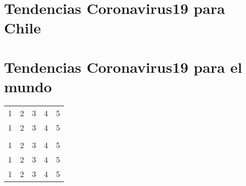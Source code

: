 \documentclass{article}
\begin{document}
\section{Tendencias Coronavirus19 para Chile}



\section{Tendencias Coronavirus19 para el mundo}



\begin{table}[]
\begin{tabular}{lllll}
1 & 2 & 3 & 4 & 5 \\

1 & 2 & 3 & 4 & 5 \\\\
1 & 2 & 3 & 4 & 5 \\
1 & 2 & 3 & 4 & 5 \\
1 & 2 & 3 & 4 & 5 \\
\end{tabular}
\end{table}
\end{document}
